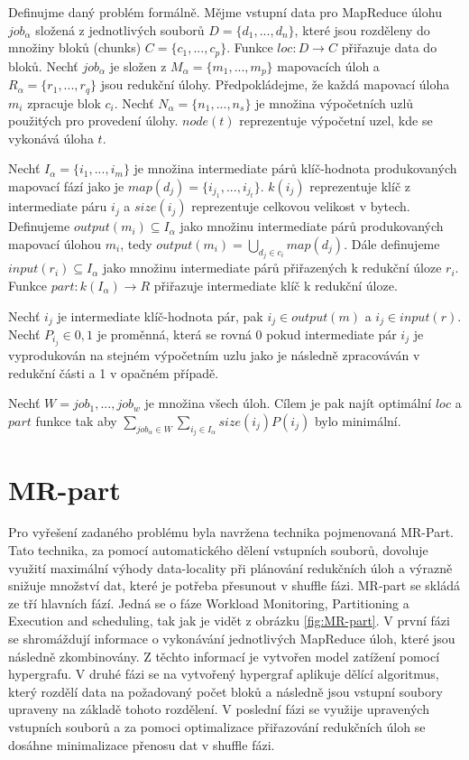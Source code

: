 \documentclass[thesis=M,czech]{FITthesis}[2012/06/26]
\begin{document}
	Definujme daný problém formálně. Mějme vstupní data pro MapReduce úlohu $job_\alpha$ složená z jednotlivých souborů $D = \{d_1, ..., d_n\}$, které jsou rozděleny do  množiny bloků (chunks) $C = \{c_1, ..., c_p\}$. Funkce $loc : D \rightarrow C$ přiřazuje data do bloků. Nechť  $job_\alpha$ je složen z $M_\alpha = \{m_1, ..., m_p\}$ mapovacích úloh a $R_\alpha = \{r_1, ..., r_q\}$ jsou redukční úlohy. Předpokládejme, že každá mapovací úloha $m_i$ zpracuje blok $c_i$. Nechť  $N_\alpha = \{n_1, ..., n_s\}$ je množina výpočetních uzlů použitých pro provedení úlohy. $node(t)$ reprezentuje výpočetní uzel, kde se vykonává úloha $t$.

Nechť $I_\alpha = \{i_1, ..., i_m\}$ je množina intermediate párů klíč-hodnota produkovaných mapovací fází jako je $map(d_j) = \{i_{j_1}, ..., i_{j_t}\}$. $k(i_j)$ reprezentuje klíč z intermediate páru $i_j$ a $size(i_j)$ reprezentuje celkovou velikost v bytech. Definujeme $output(m_i) \subseteq I_\alpha$ jako množinu intermediate párů produkovaných mapovací úlohou $m_i$, tedy $output(m_i) = \bigcup_{{d_j}\in{c_i}} map(d_j)$. Dále definujeme $input(r_i)\subseteq I_\alpha$ jako množinu intermediate párů přiřazených k redukční úloze $r_i$. Funkce $part : k(I_\alpha) \rightarrow R$ přiřazuje intermediate klíč k redukční úloze. 

Nechť $i_j$ je intermediate klíč-hodnota pár, pak  $i_j \in output(m)$ a $i_j \in input(r)$. Nechť $P_{i_j} \in {0,1}$ je proměnná, která se rovná 0 pokud intermediate pár $i_j$ je vyprodukován na stejném výpočetním uzlu jako je následně zpracováván v redukční části a 1 v opačném případě.  

Nechť $W = {job_1, ..., job_w}$ je množina všech úloh. Cílem je pak najít optimální $loc$ a $part$ funkce tak aby $\sum_{job_\alpha \in W} \sum_{i_j \in I_\alpha}  size(i_j)P(i_j) $ bylo minimální.

\section{MR-part}
Pro vyřešení zadaného problému byla navržena technika pojmenovaná MR-Part. Tato technika, za pomocí automatického dělení vstupních souborů, dovoluje využití maximální výhody data-locality při plánování redukčních úloh a výrazně snižuje množství dat, které je potřeba přesunout v shuffle fázi. MR-part se skládá ze tří hlavních fází. Jedná se o fáze Workload Monitoring, Partitioning a Execution and scheduling, tak jak je vidět z obrázku \ref{fig:MR-part}. V první fázi se shromáždují informace o vykonávání jednotlivých MapReduce úloh, které jsou následně zkombinovány. Z těchto informací je vytvořen model zatížení pomocí hypergrafu. V druhé fázi se na vytvořený hypergraf aplikuje dělící algoritmus, který rozdělí data na požadovaný počet bloků a následně jsou vstupní soubory upraveny na základě tohoto rozdělení. V poslední fázi se využije upravených vstupních souborů a za pomoci optimalizace přiřazování redukčních úloh se dosáhne minimalizace přenosu dat v shuffle fázi.
\end{document}
